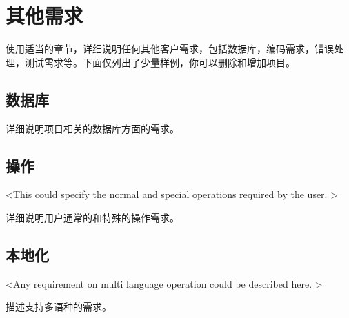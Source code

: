 \chapter{其他需求}

使用适当的章节，详细说明任何其他客户需求，包括数据库，编码需求，错误处理，测试需求等。下面仅列出了少量样例，你可以删除和增加项目。
\section{数据库}

详细说明项目相关的数据库方面的需求。
\section{操作}
<This could specify the normal and special operations required by the user. >

详细说明用户通常的和特殊的操作需求。
\section{本地化}
<Any requirement on multi language operation could be described here. >

描述支持多语种的需求。
